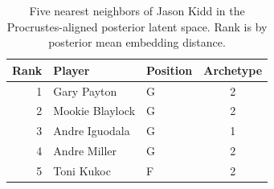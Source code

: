 \begin{table}[htbp]
  \centering\small
  \begin{tabular}{rllc}
    \toprule
    Rank & Player & Position & Archetype \\
    \midrule
    1 & Gary Payton & G & 2 \\
    2 & Mookie Blaylock & G & 2 \\
    3 & Andre Iguodala & G & 1 \\
    4 & Andre Miller & G & 2 \\
    5 & Toni Kukoc & F & 2 \\
    \bottomrule
  \end{tabular}
  \caption{Five nearest neighbors of Jason Kidd in the Procrustes-aligned posterior latent space. Rank is by posterior mean embedding distance.}
  \label{tab:Jason_Kidd_neighbors}
\end{table}

